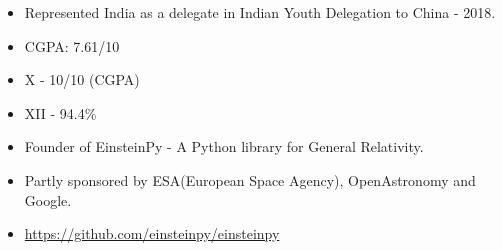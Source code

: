 
\smallskip
{}
\begin{itemize}
\item Represented India as a delegate in Indian Youth Delegation to China - 2018.
\end{itemize}



\begin{itemize}
    \item CGPA: 7.61/10
\end{itemize}

\divider

\begin{itemize}
    \item X - 10/10 (CGPA)
    \item XII - 94.4\%
\end{itemize}


\smallskip









\begin{itemize}
\item Founder of EinsteinPy - A Python library for General Relativity.
\item Partly sponsored by ESA(European Space Agency), OpenAstronomy and Google.
\item \href{https://github.com/einsteinpy/einsteinpy}{https://github.com/einsteinpy/einsteinpy}
\end{itemize}
\smallskip

